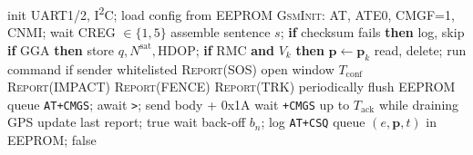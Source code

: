 \documentclass{article}
\begin{document}
\begin{algorithm}[H]
\caption{Main loop of the enhanced tracking node}
\label{alg:main}
\scriptsize
\begin{algorithmic}[1]
\State init UART1/2, I\textsuperscript{2}C; load config from EEPROM
\State \textsc{GsmInit}: AT, ATE0, CMGF=1, CNMI; wait CREG $\in\{1,5\}$
\Loop
   
    \State assemble sentence $s$; \textbf{if} checksum fails \textbf{then} log, skip
    \State \textbf{if} GGA \textbf{then} store $q, N^{\mathrm{sat}}, \mathrm{HDOP}$; \textbf{if} RMC \textbf{and} $V_k$ \textbf{then} $\mathbf{p}\gets\mathbf{p}_k$
  \EndWhile
   read, delete; run command if sender whitelisted \EndIf
   \textsc{Report}(SOS) \EndIf
   open window $T_{\mathrm{conf}}$ \EndIf
   \textsc{Report}(IMPACT) \EndIf
   \textsc{Report}(FENCE) \EndIf
   \textsc{Report}(TRK) \EndIf
  \State periodically flush EEPROM queue
\EndLoop
{}
    \State \texttt{AT+CMGS}; await \texttt{>}; send body + 0x1A
    \State wait \texttt{+CMGS} up to $T_{\mathrm{ack}}$ while draining GPS
     update last report; \Return true \EndIf
    \State wait back-off $b_n$; log \texttt{AT+CSQ}
  \EndFor
  \State queue $(e,\mathbf{p},t)$ in EEPROM; \Return false
\EndFunction
\end{algorithmic}
\end{algorithm}
\end{document}
